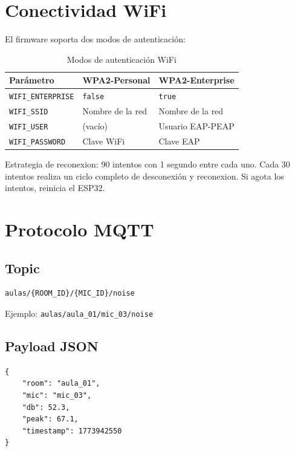\documentclass[12pt,a4paper]{report}
\begin{document}
\section{Conectividad WiFi}

El firmware soporta dos modos de autenticaci\'on:

\begin{table}[H]
\centering
\begin{tabularx}{\textwidth}{lXX}
\toprule
\textbf{Par\'ametro} & \textbf{WPA2-Personal} & \textbf{WPA2-Enterprise} \\
\midrule
\texttt{WIFI\_ENTERPRISE} & \texttt{false} & \texttt{true} \\
\texttt{WIFI\_SSID} & Nombre de la red & Nombre de la red \\
\texttt{WIFI\_USER} & (vac\'io) & Usuario EAP-PEAP \\
\texttt{WIFI\_PASSWORD} & Clave WiFi & Clave EAP \\
\bottomrule
\end{tabularx}
\caption{Modos de autenticaci\'on WiFi}
\end{table}

Estrategia de reconexion: 90 intentos con 1 segundo entre cada uno. Cada 30 intentos realiza un ciclo completo de desconexi\'on y reconexion. Si agota los intentos, reinicia el ESP32.

\section{Protocolo MQTT}

\subsection{Topic}

\begin{verbatim}
aulas/{ROOM_ID}/{MIC_ID}/noise
\end{verbatim}

Ejemplo: \texttt{aulas/aula\_01/mic\_03/noise}

\subsection{Payload JSON}

\begin{lstlisting}[style=json, caption={Mensaje MQTT de un micr\'ofono}]
{
    "room": "aula_01",
    "mic": "mic_03",
    "db": 52.3,
    "peak": 67.1,
    "timestamp": 1773942550
}
\end{lstlisting}
\end{document}
